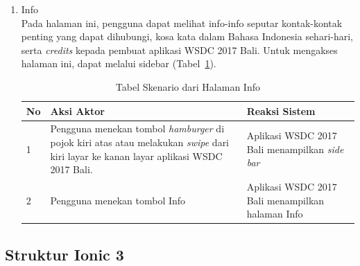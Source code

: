\begin{enumerate}
	\item Info \\
	Pada halaman ini, pengguna dapat melihat info-info seputar kontak-kontak penting yang dapat dihubungi, kosa kata dalam Bahasa Indonesia sehari-hari, serta {\it credits} kepada pembuat aplikasi WSDC 2017 Bali. Untuk mengakses halaman ini, dapat melalui sidebar (Tabel~\ref{table:skenarioHalamanInfo}).
		\begin{table}[H]
			\centering
			\begin{tabular}{|p{0.5cm}|p{7cm}|p{7cm}|}
				\hline
				No & Aksi Aktor                               & Reaksi Sistem                                          \\ \hline
				1  & Pengguna menekan tombol {\it hamburger} di pojok kiri atas atau melakukan \textit{swipe} dari kiri layar ke kanan layar aplikasi WSDC 2017 Bali. & Aplikasi WSDC 2017 Bali menampilkan {\it side bar} \\ \hline
				2  & Pengguna menekan tombol Info & Aplikasi WSDC 2017 Bali menampilkan halaman Info \\ \hline
			\end{tabular}
			\caption{Tabel Skenario dari Halaman Info}
			\label{table:skenarioHalamanInfo}
		\end{table}
\end{enumerate}

\subsection{Struktur Ionic 3}
\label{sec:StrukturIonic3SistemKini}

